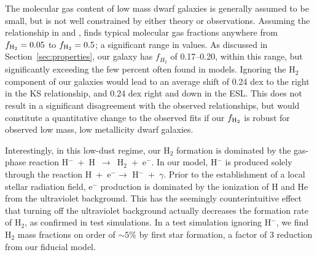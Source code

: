 \documentclass[twocolumn]{aastex61}
\begin{document}
The molecular gas content of low mass dwarf galaxies is generally assumed
to be small, but is not well constrained by either theory or observations. Assuming the relationship in \citet{Leroy2013} and \citet{Momose2013}, \citet{Roychowdhury2014} finds typical molecular gas fractions anywhere from $f_{\rm H_2} = 0.05$ to $f_{\rm H_2} = 0.5$; a significant range in values. As discussed in Section~\ref{sec:properties}, our galaxy has $f_{H_2}$ of 0.17--0.20, within this range, but significantly exceeding the few percent often found in models. Ignoring the H$_2$ component of our galaxies would lead to an average shift of 0.24 dex to the right in the KS relationship, and 0.24 dex right and down in the ESL. This does not result in a significant disagreement with the observed relationships, but would constitute a quantitative change to the observed fits if our $f_{\rm H_2}$ is robust for observed low mass, low metallicity dwarf galaxies. 

Interestingly, in this low-dust regime, our H$_2$ formation is dominated by the gas-phase reaction H$^-$~+~H~$\rightarrow$~H$_2$~+~e$^{-}$. In our model, H$^{-}$ is produced solely through the reaction H~+~e$^{-} \rightarrow$ H$^{-}$~+~$\gamma$. Prior to the establishment of a local stellar radiation field, e$^{-}$ production is dominated by the ionization of H and He from the ultraviolet background. This has the seemingly counterintuitive effect that turning off the ultraviolet background actually decreases the formation rate of H$_2$, as confirmed in test simulations. In a test simulation ignoring H$^{-}$, we find H$_{2}$ mass fractions on order of  $\sim 5\%$ by first star formation, a factor of 3 reduction from our fiducial model.
\end{document}
